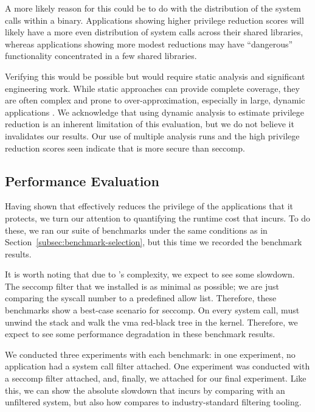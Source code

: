 A more likely reason for this could be to do with the distribution of the system
calls within a binary. Applications showing higher privilege reduction scores
will likely have a more even distribution of system calls across their shared
libraries, whereas applications showing more modest reductions may have
``dangerous'' functionality concentrated in a few shared libraries.

Verifying this would be possible but would require static analysis and significant engineering work. While static approaches can provide
complete coverage, they are often complex and prone to over-approximation, 
especially in large, dynamic applications \cite{ernst2007daikon}. We
acknowledge that using dynamic analysis to estimate privilege reduction
is an inherent limitation of this evaluation, but we do not believe it
invalidates our results. Our use of multiple analysis runs and the
high privilege reduction scores seen indicate that \af is more secure than
seccomp. 

\subsection{Performance Evaluation}\label{subsec:perf-eval}

Having shown that \af effectively reduces the privilege of the applications that
it protects, we turn our attention to quantifying the runtime cost that \af
incurs. To do these, we ran our suite of benchmarks under the same
conditions as in Section~\ref{subsec:benchmark-selection}, but this time we
recorded the benchmark results. 

It is worth noting that due to \af's complexity, we expect to see some slowdown.
The seccomp filter that we installed is as minimal as possible; we are just comparing
the syscall number to a predefined allow list. Therefore, these benchmarks show
a best-case scenario for seccomp. On every system call, \af must unwind the
stack and walk the \ac{vma} red-black tree in the kernel. Therefore, we expect
to see some performance degradation in these benchmark results.

We conducted three experiments with each benchmark: in one experiment, no
application had a system call filter attached. One experiment was conducted with
a seccomp filter attached, and, finally, we attached \af for our final
experiment. Like this, we can show the absolute slowdown that \af
incurs by comparing with an unfiltered system, but also how \af compares to
industry-standard filtering tooling.

